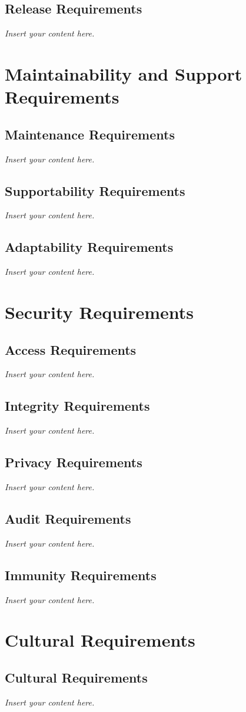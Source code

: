 \documentclass[12pt]{article}
\newcommand{\lips}{\textit{Insert your content here.}}
\begin{document}
\subsection{Release Requirements}
\lips

\section{Maintainability and Support Requirements}
\subsection{Maintenance Requirements}
\lips
\subsection{Supportability Requirements}
\lips
\subsection{Adaptability Requirements}
\lips

\section{Security Requirements}
\subsection{Access Requirements}
\lips
\subsection{Integrity Requirements}
\lips
\subsection{Privacy Requirements}
\lips
\subsection{Audit Requirements}
\lips
\subsection{Immunity Requirements}
\lips

\section{Cultural Requirements}
\subsection{Cultural Requirements}
\lips
\end{document}
